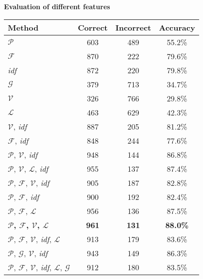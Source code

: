\documentclass[11pt,english]{article}
\makeatletter
\newenvironment{tablehere}
  {\def\@captype{table}}
  {}
\makeatother
\begin{document}
\begin{multicols}{2}
\begin{tablehere}
\centering%
\caption{\small \textbf{\textsf{Evaluation of different features}}}%
\begin{tabular}{l c c c}
\hline\hline
Method & Correct & Incorrect & Accuracy \\
[0.5ex]
\hline
$\mathcal{P}$ & 603 & 489 & 55.2\% \\
$\mathcal{F}$ & 870 & 222 & 79.6\% \\
\emph{idf} & 872 & 220 & 79.8\% \\
$\mathcal{G}$ & 379 & 713 & 34.7\% \\
$\mathcal{V}$ & 326 & 766 & 29.8\% \\
$\mathcal{L}$ & 463 & 629 & 42.3\% \\
$\mathcal{V}$, \emph{idf} & 887 & 205 & 81.2\% \\
$\mathcal{F}$, \emph{idf} & 848 & 244 & 77.6\% \\
$\mathcal{P}$, $\mathcal{V}$, \emph{idf} & 948 & 144 & 86.8\% \\
$\mathcal{P}$, $\mathcal{V}$, $\mathcal{L}$, \emph{idf} & 955 & 137 & 87.4\% \\
$\mathcal{P}$, $\mathcal{F}$, $\mathcal{V}$, \emph{idf} & 905 & 187 & 82.8\% \\
$\mathcal{P}$, $\mathcal{F}$, \emph{idf} & 900 & 192 & 82.4\% \\
$\mathcal{P}$, $\mathcal{F}$, $\mathcal{L}$ & 956 & 136 & 87.5\% \\
\textbf{$\mathcal{P}$, $\mathcal{F}$, $\mathcal{V}$, $\mathcal{L}$} & \textbf{961} & \textbf{131} & \textbf{88.0\%} \\
$\mathcal{P}$, $\mathcal{F}$, $\mathcal{V}$, \emph{idf}, $\mathcal{L}$ & 913 & 179 & 83.6\% \\
$\mathcal{P}$, $\mathcal{G}$, $\mathcal{V}$, \emph{idf} & 943 & 149 & 86.3\% \\
$\mathcal{P}$, $\mathcal{F}$, $\mathcal{V}$, \emph{idf}, $\mathcal{L}$, $\mathcal{G}$ & 912 & 180 & 83.5\% \\ [1ex]
\hline
\end{tabular}
\label{tbl:eval}%
\end{tablehere}%


\end{multicols}
\end{document}
